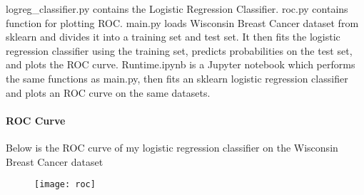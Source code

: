 \documentclass[11pt]{article}
\begin{document}
logreg\_classifier.py contains the Logistic Regression Classifier. roc.py contains function for plotting ROC.
main.py loads Wisconsin Breast Cancer dataset from sklearn and divides it into a training set and test set. It then fits the logistic regression classifier using the training set, predicts probabilities on the test set, and plots the ROC curve.
Runtime.ipynb is a Jupyter notebook which performs the same functions as main.py, then fits an sklearn logistic regression classifier and plots an ROC curve on the same datasets.

\paragraph{ROC Curve}
Below is the ROC curve of my logistic regression classifier on the Wisconsin Breast Cancer dataset

\begin{figure}[h]
\texttt{[image: roc]}
\end{figure}
\end{document}
